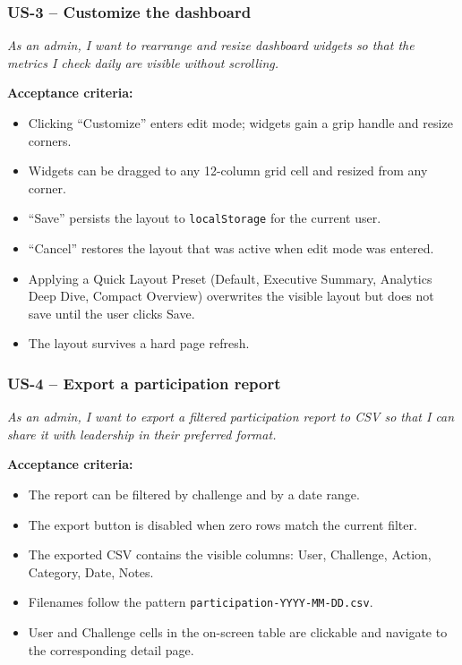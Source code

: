 \documentclass[11pt,letterpaper]{article}
\begin{document}
\subsubsection*{US-3 -- Customize the dashboard}

\textit{As an admin, I want to rearrange and resize dashboard widgets
so that the metrics I check daily are visible without scrolling.}

\textbf{Acceptance criteria:}
\begin{itemize}[noitemsep]
  \item Clicking ``Customize'' enters edit mode; widgets gain a grip
        handle and resize corners.
  \item Widgets can be dragged to any 12-column grid cell and resized
        from any corner.
  \item ``Save'' persists the layout to \texttt{localStorage} for the
        current user.
  \item ``Cancel'' restores the layout that was active when edit mode
        was entered.
  \item Applying a Quick Layout Preset (Default, Executive Summary,
        Analytics Deep Dive, Compact Overview) overwrites the visible
        layout but does not save until the user clicks Save.
  \item The layout survives a hard page refresh.
\end{itemize}

\subsubsection*{US-4 -- Export a participation report}

\textit{As an admin, I want to export a filtered participation report
to CSV so that I can share it with leadership in their preferred
format.}

\textbf{Acceptance criteria:}
\begin{itemize}[noitemsep]
  \item The report can be filtered by challenge and by a date range.
  \item The export button is disabled when zero rows match the
        current filter.
  \item The exported CSV contains the visible columns: User, Challenge,
        Action, Category, Date, Notes.
  \item Filenames follow the pattern \texttt{participation-YYYY-MM-DD.csv}.
  \item User and Challenge cells in the on-screen table are clickable
        and navigate to the corresponding detail page.
\end{itemize}
\end{document}

